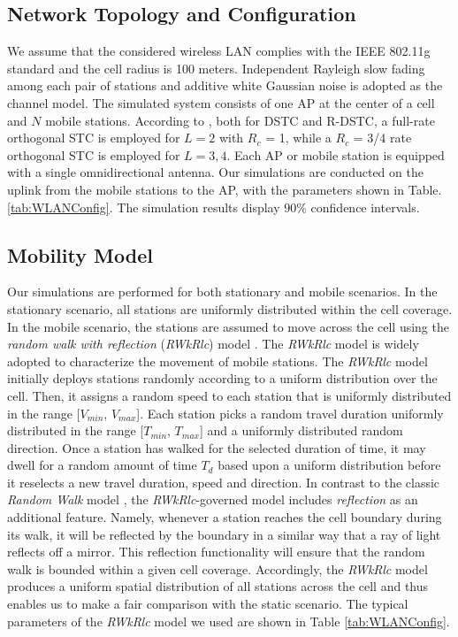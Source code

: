 \documentclass[peerreview,draftcls,onecolumn,12pt,a4paper]{IEEEtran}
\begin{document}
\vspace{-0.15in}
\subsection{Network Topology and Configuration} \label{networktopology} 
\vspace{-0.05in}

We assume that the considered wireless LAN complies with the IEEE 802.11g
standard and the cell radius is 100 meters. Independent Rayleigh slow
fading among each pair of stations and additive white Gaussian noise is adopted as the channel
model. The simulated system consists of one AP at the center of a
cell and $N$ mobile stations. According to
\cite{Jafarkhanistcbook}, both for DSTC and R-DSTC, a full-rate
orthogonal STC is employed for $L=2$ with $R_c$ = 1, while a $R_c$
= 3/4 rate orthogonal STC is employed for $L=3, 4$. Each AP or
mobile station is equipped with a single omnidirectional antenna.
Our simulations are conducted on the uplink from the mobile
stations to the AP, with the parameters shown in Table.
\ref{tab:WLANConfig}. The simulation results display 90\%
confidence intervals.

\vspace{-0.15in}
\subsection{Mobility Model} \label{mobilitymodel} 
\vspace{-0.05in}

Our simulations are performed for both
stationary and mobile scenarios. In the stationary scenario, all
stations are uniformly distributed within the cell coverage. In the mobile scenario, the stations are assumed to move across
the cell using the \emph{random walk with reflection}
(\emph{RWkRlc}) model \cite{McGuire}. The \emph{RWkRlc} model is
widely adopted to characterize the movement of
mobile stations. The \emph{RWkRlc} model initially deploys
stations randomly according to a uniform distribution over the
cell. Then, it assigns a random speed to each station that is
uniformly distributed in the range [${V_{min}}$, ${V_{max}}$].
Each station picks a random travel duration uniformly distributed
in the range [$T_{min}$, $T_{max}$] and a uniformly distributed random direction. Once a station has walked
for the selected duration of time, it may dwell for a random
amount of time $T_d$ based upon a uniform distribution before it
reselects a new travel duration, speed and direction. In
contrast to the classic \emph{Random Walk} model
\cite{mobilitymodel}, the \emph{RWkRlc}-governed model includes
\emph{reflection} as an additional feature. Namely, whenever a
station reaches the cell boundary during its walk, it will be
reflected by the boundary in a similar way that a ray of light
reflects off a mirror. This reflection functionality will ensure
that the random walk is bounded within a given   cell coverage.
Accordingly,  the \emph{RWkRlc} model produces a uniform spatial
distribution of all stations across the cell and thus enables us
to make a fair comparison with the static scenario. The typical parameters of the \emph{RWkRlc} model we used
are shown in Table \ref{tab:WLANConfig}.
\end{document}
